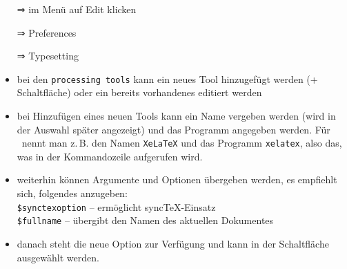 \documentclass{scrartcl}
\begin{document}
\begin{itemize}
\item[⇒] im Menü auf Edit klicken
\item[⇒] Preferences
\item[⇒] Typesetting
\item bei den \verb|processing tools| kann ein neues Tool hinzugefügt werden (+ Schaltfläche) oder ein bereits vorhandenes editiert werden
\item bei Hinzufügen eines neuen Tools kann ein Name vergeben werden (wird in der Auswahl später angezeigt) und das Programm angegeben werden. Für \XeLaTeX\ nennt man z.\,B. den Namen \verb|XeLaTeX| und das Programm \verb|xelatex|, also das, was in der Kommandozeile aufgerufen wird.
\item weiterhin können Argumente und Optionen übergeben werden, es empfiehlt sich, folgendes anzugeben:\\
\verb|$synctexoption| – ermöglicht sync\TeX-Einsatz\\
\verb|$fullname| – übergibt den Namen des aktuellen Dokumentes
\item danach steht die neue Option zur Verfügung und kann in der Schaltfläche ausgewählt werden.
\end{itemize}
\end{document}
